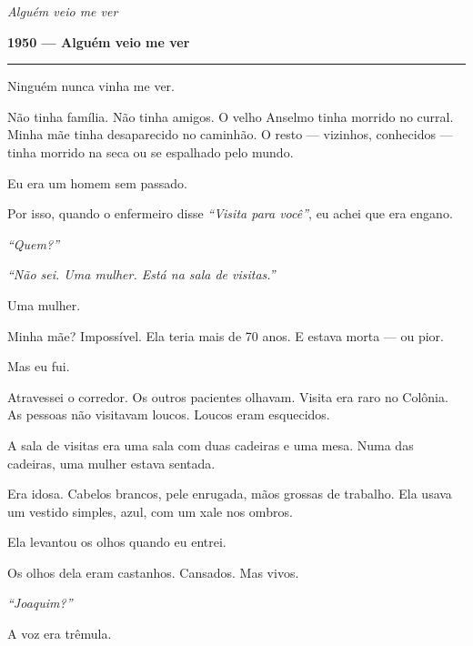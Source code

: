 
\noindent \textit{Alguém veio me ver}

\noindent \textbf{1950 --- Alguém veio me ver}

\vspace{0.5em}\noindent\rule{\textwidth}{0.5pt}\vspace{0.5em}

\noindent Ninguém nunca vinha me ver.

\noindent Não tinha família. Não tinha amigos. O velho Anselmo tinha morrido no curral. Minha mãe tinha desaparecido no caminhão. O resto --- vizinhos, conhecidos --- tinha morrido na seca ou se espalhado pelo mundo.

\noindent Eu era um homem sem passado.

\noindent Por isso, quando o enfermeiro disse \textit{\textquotedblleft{}Visita para você\textquotedblright{}}, eu achei que era engano.

\noindent \textit{\textquotedblleft{}Quem?\textquotedblright{}}

\noindent \textit{\textquotedblleft{}Não sei. Uma mulher. Está na sala de visitas.\textquotedblright{}}

\noindent Uma mulher.

\noindent Minha mãe? Impossível. Ela teria mais de 70 anos. E estava morta --- ou pior.

\noindent Mas eu fui.

\noindent Atravessei o corredor. Os outros pacientes olhavam. Visita era raro no Colônia. As pessoas não visitavam loucos. Loucos eram esquecidos.

\noindent A sala de visitas era uma sala com duas cadeiras e uma mesa. Numa das cadeiras, uma mulher estava sentada.

\noindent Era idosa. Cabelos brancos, pele enrugada, mãos grossas de trabalho. Ela usava um vestido simples, azul, com um xale nos ombros.

\noindent Ela levantou os olhos quando eu entrei.

\noindent Os olhos dela eram castanhos. Cansados. Mas vivos.

\noindent \textit{\textquotedblleft{}Joaquim?\textquotedblright{}}

\noindent A voz era trêmula.

